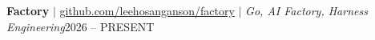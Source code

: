 \resumeProjectHeading
{{\textbf{Factory} $|$ \href{https://github.com/leehosanganson/factory}{\underline{github.com/leehosanganson/factory}}} $|$ \emph{Go, AI Factory, Harness Engineering}}{2026 -- PRESENT}
\resumeItemListStart
{}
\resumeItemListEnd
